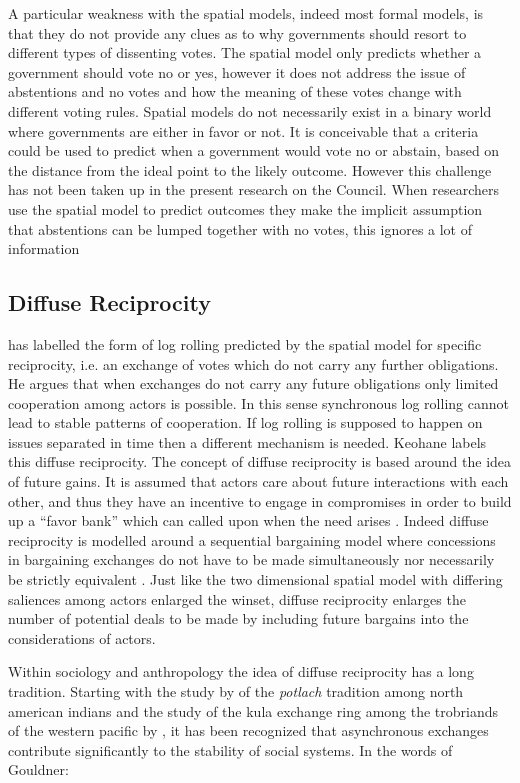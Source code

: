 A particular weakness with the spatial models, indeed most formal models, is that they do not provide any clues as to why governments should resort to different types of dissenting votes. The spatial model only predicts whether a government should vote no or yes, however it does not address the issue of abstentions and no votes and how the meaning of these votes change with different voting rules. Spatial models do not necessarily exist in a binary world where governments are either in favor or not. It is conceivable that a criteria could be used to predict when a government would vote no or abstain, based on the distance from the ideal point to the likely outcome. However this challenge has not been taken up in the present research on the Council. When researchers use the spatial model to predict outcomes they make the implicit assumption that abstentions can be lumped together with no votes, this ignores a lot of information  

\subsection{Diffuse Reciprocity}

\citet{Keohane1986} has labelled the form of log rolling predicted  by the spatial model for specific reciprocity, i.e. an exchange of votes which do not carry any further obligations. He argues that when exchanges do not carry any future obligations only limited cooperation among actors is possible. In this sense synchronous log rolling cannot lead to stable patterns of cooperation. If log rolling is supposed to happen on issues separated in time then a different mechanism is needed. Keohane labels this diffuse reciprocity. The concept of diffuse reciprocity is based around the idea of future gains. It is assumed that actors care about future interactions with each other, and thus they have an incentive to engage in compromises in order to build up a ``favor bank'' which can called upon when the need arises \citep{Heisenberg2005}. Indeed diffuse reciprocity is modelled around a sequential bargaining model where concessions in bargaining exchanges do not have to be made simultaneously nor necessarily be strictly equivalent \citep{Jonsson2000}.  Just like the two dimensional spatial model with differing saliences among actors enlarged the winset, diffuse reciprocity enlarges the number of potential deals to be made by including future bargains into the considerations of actors. 

Within sociology and anthropology the idea of diffuse reciprocity has a long tradition. Starting with the study by \citet{Mauss1950} of the \textsl{potlach} tradition among north american indians and the study of the kula exchange ring among the trobriands of the western pacific by \citet{Malinowski1922}, it has been recognized that asynchronous exchanges contribute significantly to the stability of social systems. In the words of Gouldner:

